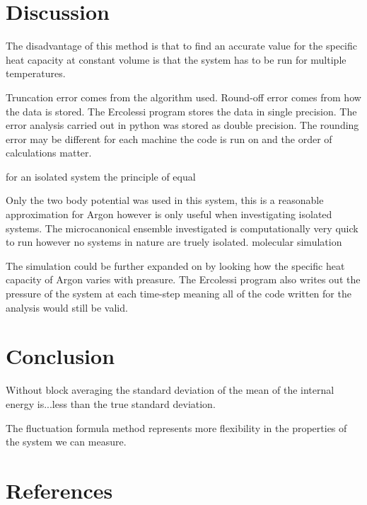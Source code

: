 \documentclass[a4paper, oneside 12pt]{article}
\begin{document}
\begin{addmargin}[-3em]{-3em}
\newpage
\section{Discussion}



The disadvantage of this method is that to find an accurate value for the specific heat capacity at constant volume is that the system has to be run for multiple temperatures.  

Truncation error comes from the algorithm used. 
Round-off error comes from how the data is stored. The Ercolessi program stores the data in single precision. The error analysis carried out in python was stored as double precision. The rounding error may be different for each machine the code is run on and the order of calculations matter.


for an isolated system the principle of equal 

Only the two body potential was used in this system, this is a reasonable approximation for Argon however is only useful when investigating isolated systems. The microcanonical ensemble investigated is computationally very quick to run however no systems in nature are truely isolated.   molecular simulation  

The simulation could be further expanded on by looking how the specific heat capacity of Argon varies with preasure. The Ercolessi program also writes out the pressure of the system at each time-step meaning all of the code written for the analysis would still be valid.

\newpage
\section{Conclusion}



Without block averaging the standard deviation of the mean of the internal energy is...less than the true standard deviation. 

The fluctuation formula method represents more flexibility in the properties of the system we can measure. 





\section{References}






\end{addmargin}
\end{document}
